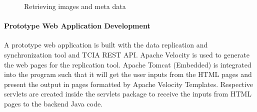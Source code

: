 \documentclass[conference]{IEEEtran}
\begin{document}
\begin{figure}[!htbp]
\begin{center}
\end{center}
 \caption{Retrieving images and meta data}
 \label{fig:methods}
\end{figure}

\paragraph*{Prototype Web Application Development}
A prototype web application is built with the data replication and synchronization tool and TCIA REST API. Apache Velocity is used to generate the web pages for the replication tool. Apache Tomcat (Embedded) is integrated into the program such that it will get the user inputs from the HTML pages and present the output in pages formatted by Apache Velocity Templates. Respective servlets are created inside the servlets package to receive the inputs from HTML pages to the backend Java code.
\end{document}
